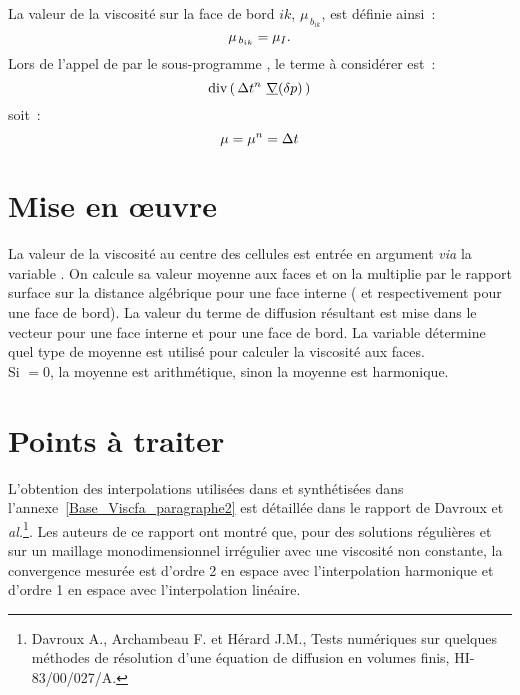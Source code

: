 La valeur de la viscosité sur la face de bord $ik$, $\mu_{\,b_{ik}}$, est définie
ainsi~:\\
\begin{equation}\notag
\mu_{\,b_{ik}}=\mu_I.
\end{equation}
Lors de l'appel de  par le sous-programme , le terme
à considérer est~:
\begin{equation}\notag
\text{div}\, (\,\Delta t^n \ \underline{\nabla}(\delta p)\,)
\end{equation}
soit~:
\begin{equation}\notag
\mu = \mu^n = \Delta t
\end{equation}

\section*{Mise en \oe uvre}
La valeur de la viscosité au centre des cellules est entrée en argument {\it
  via} la variable . On calcule sa valeur moyenne aux faces et on
la multiplie par le rapport surface  sur la distance algébrique
 pour une face interne ( et  respectivement
pour une face de bord). La valeur du terme de diffusion résultant est mise dans
le vecteur  pour une face interne et  pour une face de
bord.  La variable  détermine quel type de moyenne est utilisé pour
calculer la viscosité aux faces.\\
Si $=0$, la moyenne est arithmétique, sinon la moyenne est harmonique.\\

\section*{Points à traiter}
L'obtention des interpolations utilisées dans \CS et synthétisées dans
l'annexe~\ref{Base_Viscfa_paragraphe2} est détaillée dans le rapport de Davroux
et \textit{al.}\footnote{%
  Davroux A., Archambeau F. et Hérard J.M., Tests numériques sur quelques
  méthodes de résolution d'une équation de diffusion en volumes finis,
  HI-83/00/027/A.}.
%
Les auteurs de ce rapport ont montré que, pour des solutions régulières et sur
un maillage monodimensionnel irrégulier avec une viscosité non constante, la
convergence mesurée est d'ordre 2 en espace avec l'interpolation harmonique et
d'ordre 1 en espace avec l'interpolation linéaire.

